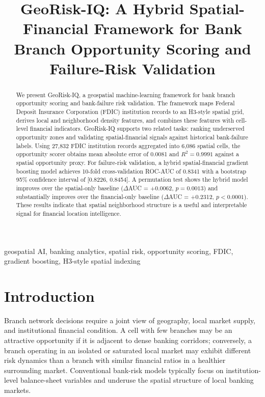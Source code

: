 \documentclass[conference]{IEEEtran}
\begin{document}
\title{GeoRisk-IQ: A Hybrid Spatial-Financial Framework for Bank Branch Opportunity Scoring and Failure-Risk Validation}

\author{
}

\maketitle

\begin{abstract}
We present GeoRisk-IQ, a geospatial machine-learning framework for bank
branch opportunity scoring and bank-failure risk validation. The framework
maps Federal Deposit Insurance Corporation (FDIC) institution records to an
H3-style spatial grid, derives local and neighborhood density features, and
combines these features with cell-level financial indicators. GeoRisk-IQ
supports two related tasks: ranking underserved opportunity zones and
validating spatial-financial signals against historical bank-failure labels.
Using 27,832 FDIC institution records aggregated into 6,086 spatial cells,
the opportunity scorer obtains mean absolute error of 0.0081 and
$R^2=0.9991$ against a spatial opportunity proxy. For failure-risk
validation, a hybrid spatial-financial gradient boosting model achieves
10-fold cross-validation ROC-AUC of 0.8341 with a bootstrap 95\% confidence
interval of [0.8226, 0.8454]. A permutation test shows the hybrid model
improves over the spatial-only baseline ($\Delta$AUC = +0.0062,
$p=0.0013$) and substantially improves over the financial-only baseline
($\Delta$AUC = +0.2312, $p<0.0001$). These results indicate that spatial
neighborhood structure is a useful and interpretable signal for financial
location intelligence.
\end{abstract}

\begin{IEEEkeywords}
geospatial AI, banking analytics, spatial risk, opportunity scoring,
FDIC, gradient boosting, H3-style spatial indexing
\end{IEEEkeywords}

\section{Introduction}
Branch network decisions require a joint view of geography, local market
supply, and institutional financial condition. A cell with few branches may
be an attractive opportunity if it is adjacent to dense banking corridors;
conversely, a branch operating in an isolated or saturated local market may
exhibit different risk dynamics than a branch with similar financial ratios
in a healthier surrounding market. Conventional bank-risk models typically
focus on institution-level balance-sheet variables and underuse the spatial
structure of local banking markets.
\end{document}
